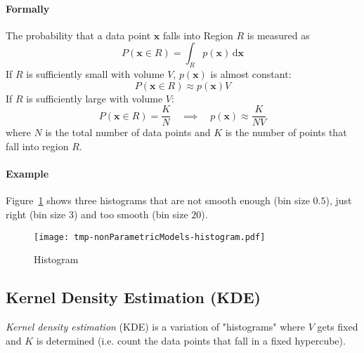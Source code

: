 \documentclass[a4paper, 11pt, accentcolor = tud3b]{tudreport}
\newcommand{\dif}[1]{\ensuremath{\,\mathrm{d}#1}}
\renewcommand{\vec}[1]{\mathbf{#1}}
\begin{document}
				\paragraph{Formally}
					The probability that a data point \(\vec{x}\) falls into Region \(R\) is measured as
					\begin{equation}
						P(\vec{x} \in R) = \int_R p(\vec{x}) \dif{\vec{x}}
					\end{equation}
					If \(R\) is sufficiently small with volume \(V\), \(p(\vec{x})\) is almost constant:
					\begin{equation}
						P(\vec{x} \in R) \approx p(\vec{x}) V
					\end{equation}
					If \(R\) is sufficiently large with volume \(V\):
					\begin{equation}
						P(\vec{x} \in R) = \frac{K}{N} \quad\implies\quad p(\vec{x}) \approx \frac{K}{NV}
					\end{equation}
					where \(N\) is the total number of data points and \(K\) is the number of points that fall into region \(R\).

				\paragraph{Example}
					Figure~\ref{fig:histogram} shows three histograms that are not smooth enough (bin size \(0.5\)), just right (bin size \(3\)) and too smooth (bin size \(20\)).

					\begin{figure}
						\centering
						\texttt{[image: tmp-nonParametricModels-histogram.pdf]}
						\caption{Histogram}
						\label{fig:histogram}
					\end{figure}

			\subsection{Kernel Density Estimation (KDE)}
				\emph{Kernel density estimation} (KDE) is a variation of "histograms" where \(V\) gets fixed and \(K\) is determined (i.e. count the data points that fall in a fixed hypercube).
\end{document}
